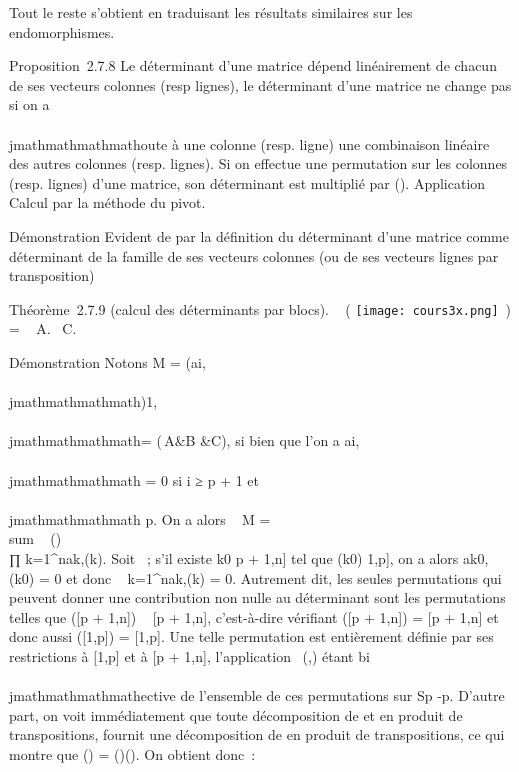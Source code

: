 Tout le reste s'obtient en traduisant les résultats similaires sur les
endomorphismes.

Proposition~2.7.8 Le déterminant d'une matrice dépend linéairement de
chacun de ses vecteurs colonnes (resp lignes), le déterminant d'une
matrice ne change pas si on a\\\\jmathmathmathmathoute à une colonne (resp. ligne) une
combinaison linéaire des autres colonnes (resp. lignes). Si on effectue
une permutation \sigma sur les colonnes (resp. lignes) d'une matrice, son
déterminant est multiplié par \epsilon(\sigma). Application Calcul par la méthode du
pivot.

Démonstration Evident de par la définition du déterminant d'une matrice
comme déterminant de la famille de ses vecteurs colonnes (ou de ses
vecteurs lignes par transposition)

Théorème~2.7.9 (calcul des déterminants par blocs).
~
\left ( \texttt{[image: cours3x.png]}
\,\right ) = \
A.~ C.

Démonstration Notons M = (ai,\\\\jmathmathmathmath)1\leqi,\\\\jmathmathmathmath\leqn =
\left
(\matrix\,A&B
&C\right ), si bien que l'on a ai,\\\\jmathmathmathmath = 0 si i
≥ p + 1 et \\\\jmathmathmathmath \leq p. On a alors
~ M
= \\sum ~
\sigma\inSn\epsilon(\sigma)\\∏
 k=1^nak,\sigma(k). Soit \sigma \inSn~; s'il
existe k0 \in {[}p + 1,n{]} tel que \sigma(k0) \in {[}1,p{]},
on a alors ak0,\sigma(k0) = 0 et donc
\∏ ~
k=1^nak,\sigma(k) = 0. Autrement dit, les seules
permutations qui peuvent donner une contribution non nulle au
déterminant sont les permutations \sigma \inSn telles que \sigma({[}p +
1,n{]}) \subset~ {[}p + 1,n{]}, c'est-à-dire vérifiant \sigma({[}p + 1,n{]}) = {[}p
+ 1,n{]} et donc aussi \sigma({[}1,p{]}) = {[}1,p{]}. Une telle permutation \sigma
est entièrement définie par ses restrictions  à {[}1,p{]} et
 à {[}p + 1,n{]}, l'application
\sigma\mapsto~(\sigma1,\sigma2) étant bi\\\\jmathmathmathmathective
de l'ensemble de ces permutations sur Sp \timesSn-p.
D'autre part, on voit immédiatement que toute décomposition de
 et  en produit de transpositions, fournit une
décomposition de \sigma en produit de transpositions, ce qui montre que \epsilon(\sigma)
= \epsilon(\sigma1)\epsilon(\sigma2). On obtient donc~:


